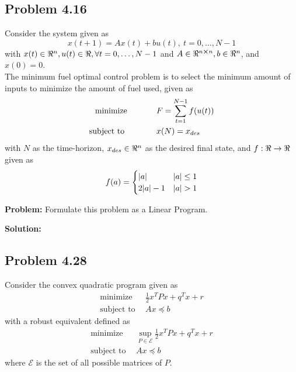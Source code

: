 \documentclass[letter]{article}
\begin{document}
\newpage
\subsection{Problem 4.16}
Consider the system given as
\begin{equation}\label{eq:dyn_sys_def}
	x(t+1) = A x(t) + b u(t), \ t = 0,\dots,N-1
\end{equation}
with $x(t) \in \real^n, u(t) \in \real, \forall t = 0,\dots,N-1$ and $A \in \real^{n\cross n}, b \in \real^n$, and $x(0) = 0$.\\

The minimum fuel optimal control problem is to select the minimum amount of inputs to minimize the amount of fuel used, given as
\begin{equation}\label{eq:min_fuel_problem_def}
	\begin{aligned}
		\text{minimize} \hspace{0.5in} &F = \sum_{t=1}^{N-1} f(u(t))\\
		\text{subject to \hspace{0.5in}} & x(N) = x_{des}
	\end{aligned}	
\end{equation}
with $N$ as the time-horizon, $x_{des} \in \real^n$ as the desired final state, and $f: \real \to \real$ given as
\begin{equation}\label{eq:fuel_usage_def}
	f(a) = 
	\begin{cases}
		\abs{a} & \abs{a} \leq 1 \\
		2 \abs{a} - 1 & \abs{a} > 1
	\end{cases}
\end{equation}

\textbf{Problem:}
Formulate this problem as a Linear Program.


\textbf{Solution:}





\newpage
\subsection{Problem 4.28}
Consider the convex quadratic program given as
\begin{equation}\label{eq:convex_quadratic_program}
	\begin{aligned}
		\text{minimize} \ \ & \frac{1}{2} x^T P x + q^T x + r\\
		\text{subject to} \ \ & Ax \preceq b
	\end{aligned}
\end{equation}
with a robust equivalent defined as
\begin{equation}\label{eq:robust_convex_quadratic_program}
	\begin{aligned}
		\text{minimize} \ \ & \sup_{P\in \mathcal{E}}{\frac{1}{2} x^T P x + q^T x + r}\\
		\text{subject to} \ \ & Ax \preceq b
	\end{aligned}
\end{equation}
where $\mathcal{E}$ is the set of all possible matrices of $P$.
\end{document}
